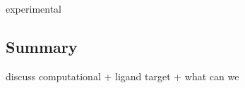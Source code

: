 \documentclass[12pt, b5paper,twoside]{tesi_upf}
\begin{document}
\par experimental 


 \subsection{Summary}
 
 \par discuss computational + ligand target + what can we 
 
 
 
 
 


%



\backmatter
\printindex

\printbibliography
\end{document}
